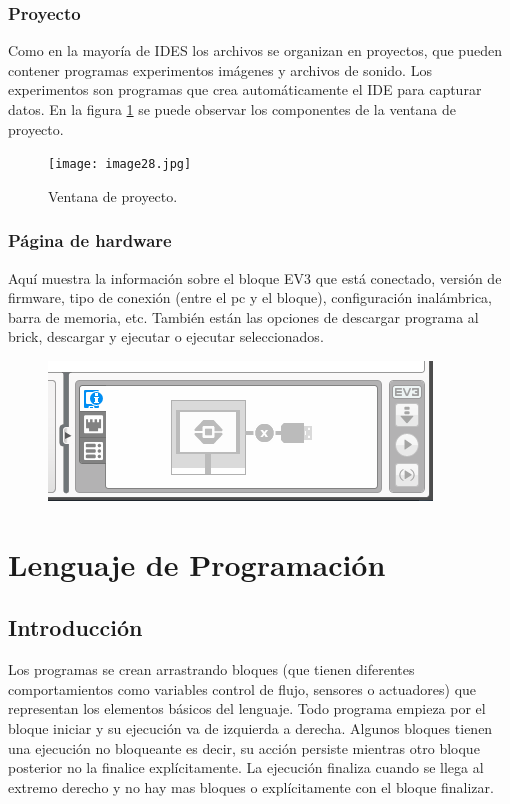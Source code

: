 \documentclass[12pt,a4paper]{article}
\begin{document}
\subsubsection{Proyecto}

Como en la mayoría de IDES los archivos se organizan en proyectos, que pueden
contener programas experimentos imágenes y archivos de sonido. Los experimentos
son programas que crea automáticamente el IDE para capturar datos. En la figura
\ref{fig:proyecto} se puede observar los componentes de la ventana de proyecto.

\begin{figure}
	\caption{Ventana de proyecto.\label{fig:proyecto}}
	\texttt{[image: image28.jpg]}
	\centering
\end{figure}

\subsubsection{Página de hardware}
Aquí muestra la información sobre el bloque EV3 que está conectado, versión de
firmware, tipo de conexión (entre el pc y el bloque), configuración inalámbrica,
barra de memoria, etc. También están las opciones de descargar programa al
brick, descargar y ejecutar o ejecutar seleccionados.

\begin{figure}[H]
	\includegraphics{controEV3.PNG}
	\centering
\end{figure}

\clearpage 
\section{Lenguaje de Programación}

\subsection{Introducción}

Los programas se crean arrastrando bloques (que tienen diferentes comportamientos
como variables control de flujo, sensores o actuadores) que representan los
elementos básicos del lenguaje. Todo programa empieza por el bloque iniciar y su
ejecución va de izquierda a derecha. Algunos bloques tienen una ejecución no
bloqueante es decir, su acción persiste mientras otro bloque posterior no la
finalice explícitamente. La ejecución finaliza cuando se llega al extremo derecho
y no hay mas bloques o explícitamente con el bloque finalizar.
\end{document}
